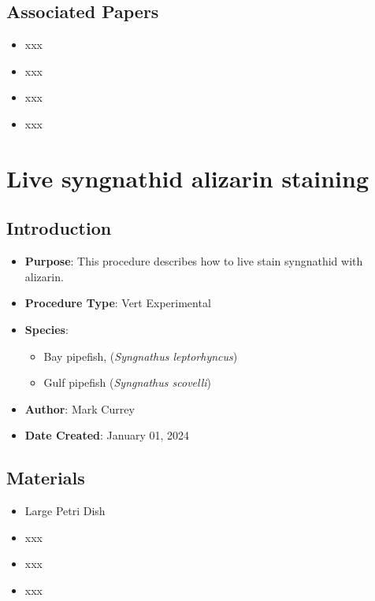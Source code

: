\documentclass[
  letterpaper,
  DIV=11,
  numbers=noendperiod]{scrreprt}
\providecommand{\tightlist}{%
  \setlength{\itemsep}{0pt}\setlength{\parskip}{0pt}}\usepackage{longtable,booktabs,array}
\begin{document}
\hypertarget{associated-papers-54}{%
\section{Associated Papers}\label{associated-papers-54}}

\begin{itemize}
\tightlist
\item
  xxx
\item
  xxx
\item
  xxx
\item
  xxx
\end{itemize}

\hypertarget{sec-vert_exp-live_alizarin_syngnathid}{%
\chapter{Live syngnathid alizarin
staining}\label{sec-vert_exp-live_alizarin_syngnathid}}

\hypertarget{introduction-86}{%
\section{Introduction}\label{introduction-86}}

\begin{itemize}
\tightlist
\item
  \textbf{Purpose}: This procedure describes how to live stain
  syngnathid with alizarin.
\item
  \textbf{Procedure Type}: Vert Experimental
\item
  \textbf{Species}:

  \begin{itemize}
  \tightlist
  \item
    Bay pipefish, (\emph{Syngnathus leptorhyncus})
  \item
    Gulf pipefish (\emph{Syngnathus scovelli})
  \end{itemize}
\item
  \textbf{Author}: Mark Currey
\item
  \textbf{Date Created}: January 01, 2024
\end{itemize}

\hypertarget{materials-81}{%
\section{Materials}\label{materials-81}}

\begin{itemize}
\tightlist
\item
  Large Petri Dish
\item
  xxx
\item
  xxx
\item
  xxx
\end{itemize}
\end{document}
